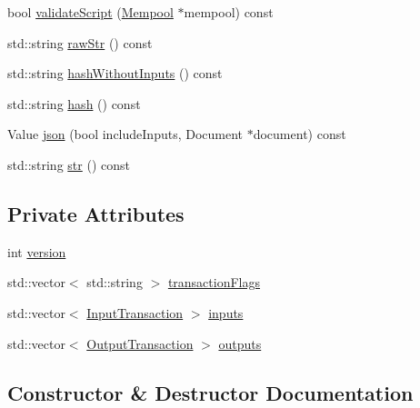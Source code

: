 \begin{DoxyCompactItemize}
\item 
bool \mbox{\hyperlink{classTransaction_af326a5ba5ac0b525f326836423f3aa5f}{validate\+Script}} (\mbox{\hyperlink{classMempool}{Mempool}} $\ast$mempool) const
\item 
std\+::string \mbox{\hyperlink{classTransaction_a90b3668de562cc1b7f5773e72ac9f6dc}{raw\+Str}} () const
\item 
std\+::string \mbox{\hyperlink{classTransaction_a0f5aa15dc325b98730ba5eb786b0ffb2}{hash\+Without\+Inputs}} () const
\item 
std\+::string \mbox{\hyperlink{classTransaction_a99a851c61b60c1dd15b3e9bdd50f32f6}{hash}} () const
\item 
Value \mbox{\hyperlink{classTransaction_a41561665dfeef8f887fdc86f3c9849f8}{json}} (bool include\+Inputs, Document $\ast$document) const
\item 
std\+::string \mbox{\hyperlink{classTransaction_accf9cca56688761bdb9518c3f1b90ed5}{str}} () const
\end{DoxyCompactItemize}
\subsection*{Private Attributes}
\begin{DoxyCompactItemize}
\item 
int \mbox{\hyperlink{classTransaction_a7d8682b58b273ea2d0d6071355175ea3}{version}}
\item 
std\+::vector$<$ std\+::string $>$ \mbox{\hyperlink{classTransaction_afba77571560d1c92a2bb55a2adc4a9fc}{transaction\+Flags}}
\item 
std\+::vector$<$ \mbox{\hyperlink{structInputTransaction}{Input\+Transaction}} $>$ \mbox{\hyperlink{classTransaction_a3a4705bed22f34645476fd9642baf806}{inputs}}
\item 
std\+::vector$<$ \mbox{\hyperlink{structOutputTransaction}{Output\+Transaction}} $>$ \mbox{\hyperlink{classTransaction_a1a3d542cd9b8045e1256f128728fab37}{outputs}}
\end{DoxyCompactItemize}


\subsection{Constructor \& Destructor Documentation}
\mbox{\label{classTransaction_ab47005b855d38bc324bb79fd023baa13}} 
